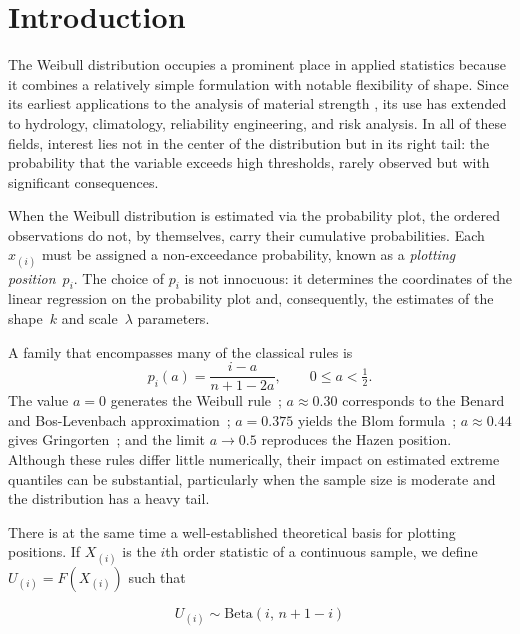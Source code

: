 \documentclass[APA,STIX1COL]{WileyNJD-v2}
\begin{document}
\section{Introduction}\label{sec:intro}

The Weibull distribution occupies a prominent place in applied
statistics because it combines a relatively simple formulation
with notable flexibility of shape. Since its earliest applications
to the analysis of material strength \citep{weibull1951}, its use
has extended to hydrology, climatology, reliability engineering,
and risk analysis. In all of these fields, interest lies not in
the center of the distribution but in its right tail: the
probability that the variable exceeds high thresholds, rarely
observed but with significant consequences.

When the Weibull distribution is estimated via the probability
plot, the ordered observations do not, by themselves, carry their
cumulative probabilities. Each $x_{(i)}$ must be assigned a
non-exceedance probability, known as a \emph{plotting position}~$p_i$.
The choice of $p_i$ is not innocuous: it determines the coordinates
of the linear regression on the probability plot and, consequently,
the estimates of the shape~$k$ and scale~$\lambda$ parameters.

A family that encompasses many of the classical rules is
\begin{equation}\label{eq:familia_intro}
p_i(a) = \frac{i - a}{n + 1 - 2a},\qquad 0 \leq a < \tfrac{1}{2}.
\end{equation}
The value $a=0$ generates the Weibull rule~\citep{weibull1951};
$a\approx 0.30$ corresponds to the Benard and
Bos-Levenbach approximation~\citeyearpar{benard1953};
$a=0.375$ yields the Blom formula~\citeyearpar{blom1958};
$a\approx 0.44$ gives Gringorten~\citeyearpar{gringorten1963};
and the limit $a\to 0.5$ reproduces the Hazen position.
Although these rules differ little numerically, their impact on
estimated extreme quantiles can be substantial, particularly
when the sample size is moderate and the distribution has a
heavy tail.

There is at the same time a well-established theoretical basis
for plotting positions. If $X_{(i)}$ is the $i$th order statistic
of a continuous sample, we define $U_{(i)}=F(X_{(i)})$ such that

\begin{equation*}
    U_{(i)}\sim\mathrm{Beta}(i,\,n+1-i)
\end{equation*}
\end{document}
